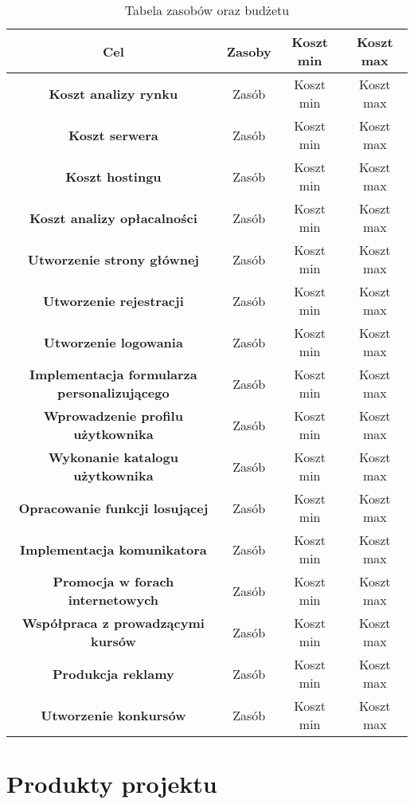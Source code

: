 \documentclass[12pt,a4paper]{article}
\begin{document}
\begin{table}[htb]
\centering
  \begin{tabular}{c|c|c|c}
  \hline
  {\bf Cel} & {\bf Zasoby} & {\bf Koszt min} & {\bf Koszt max} \\
  \hline
  \textbf{Koszt analizy rynku} & Zasób & Koszt min & Koszt max\\
  \hline
  \textbf{Koszt serwera} & Zasób & Koszt min & Koszt max\\
  \hline
  \textbf{Koszt hostingu} & Zasób & Koszt min & Koszt max\\
  \hline
  \textbf{Koszt analizy opłacalności} & Zasób & Koszt min & Koszt max\\
  \hline
  \textbf{Utworzenie strony głównej} & Zasób & Koszt min & Koszt max\\
  \hline
  \textbf{Utworzenie rejestracji} & Zasób & Koszt min & Koszt max\\
  \hline
  \textbf{Utworzenie logowania} & Zasób & Koszt min & Koszt max\\
  \hline
  \textbf{Implementacja formularza personalizującego} & Zasób & Koszt min & Koszt max\\
  \hline
  \textbf{Wprowadzenie profilu użytkownika} & Zasób & Koszt min & Koszt max\\
  \hline
  \textbf{Wykonanie katalogu użytkownika} & Zasób & Koszt min & Koszt max\\
  \hline
  \textbf{Opracowanie funkcji losującej} & Zasób & Koszt min & Koszt max\\
  \hline
  \textbf{Implementacja komunikatora} & Zasób & Koszt min & Koszt max\\
  \hline
  \textbf{Promocja w forach internetowych} & Zasób & Koszt min & Koszt max\\
  \hline
  \textbf{Współpraca z prowadzącymi kursów} & Zasób & Koszt min & Koszt max\\
  \hline
  \textbf{Produkcja reklamy} & Zasób & Koszt min & Koszt max\\
  \hline
  \textbf{Utworzenie konkursów} & Zasób & Koszt min & Koszt max\\
  \hline
  \end{tabular}
\caption{Tabela zasobów oraz budżetu}
\label{tab:zasoby}
\end{table}

\newpage

\section{Produkty projektu}
\end{document}

